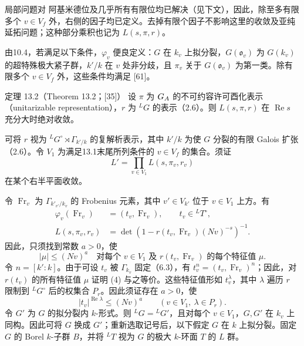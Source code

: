 局部问题对 阿基米德位及几乎所有有限位均已解决（见下文），因此，除至多有限多个 $v\in V_f$ 外，右侧的因子均已定义。去掉有限个因子不影响这里的收敛及亚纯延拓问题；这种部分乘积也记为 $L(s,\pi,r)$。

由10.4，若满足以下条件，$\varphi_v$ 便良定义：$G$ 在 $k_v$ 上拟分裂，$G(\mathfrak o_v)$ 为 $G(k_v)$ 的超特殊极大紧子群，$k'/k$ 在 $v$ 处非分歧，且 $\pi_v$ 关于 $G(\mathfrak o_v)$ 为第一类。除有限多个 $v\in V_f$ 外，这些条件均满足 [61]。

\begin{originaltheorem}{定理 13.2（Theorem 13.2；[35]）}
设 $\pi$ 为 $G_{A}$ 的不可约容许可酉化表示（unitarizable representation），$r$ 为 ${}^LG$ 的表示（2.6）。则 $L(s,\pi,r)$ 在 $\operatorname{Re}s$ 充分大时绝对收敛。
\end{originaltheorem}
可将 $r$ 视为 ${}^LG^\circ\rtimes\Gamma_{k'/k}$ 的复解析表示，其中 $k'/k$ 为使 $G$ 分裂的有限 Galois 扩张（2.6）。令 $V_1$ 为满足13.1末尾所列条件的 $v\in V_f$ 的集合。须证
\begin{equation}
 L'=\prod_{v\in V_1}L(s,\pi_v,r_v)\tag{1}
\end{equation}
在某个右半平面收敛。

令 $\operatorname{Fr}_v$ 为 $\Gamma_{k'_{v'}/k_v}$ 的 Frobenius 元素，其中 $v'\in V_{k'}$ 位于 $v\in V_1$ 上方。有
\begin{align}
 \varphi_v(\operatorname{Fr}_v)&=(t_v,\operatorname{Fr}_v),\qquad t_v\in{}^LT^\circ,\tag{2}\\
 L(s,\pi_v,r_v)&=\det(1-r(t_v,\operatorname{Fr}_v)(Nv)^{-s})^{-1}.\tag{3}
\end{align}
因此，只须找到常数 $a>0$，使
\begin{equation}
 |\mu|\leq(Nv)^a\quad
 \text{对每个 }v\in V_1\text{ 及 }r(t_v,\operatorname{Fr}_v)\text{ 的每个特征值 }\mu.\tag{4}
\end{equation}
令 $n=[k':k]$。由于可设 $t_v$ 被 $\Gamma_{k_v}$ 固定（6.3），有 $t_v^n=(t_v,\operatorname{Fr}_v)^n$；因此，对 $r(t_v)$ 的所有特征值 $\mu$ 证明 (4) 与之等价。这些特征值形如 $t_v^\lambda$，其中 $\lambda$ 遍历 $r$ 限制到 ${}^LG^\circ$ 后的权集合 $P_r$。因此须证存在 $a>0$，使
\begin{equation}
 |t_v|^{\operatorname{Re}\lambda}\leq(Nv)^a
 \qquad(v\in V_1,\ \lambda\in P_r).\tag{5}
\end{equation}
令 $G'$ 为 $G$ 的拟分裂内 $k$-形式。则 ${}^LG={}^LG'$，且对每个 $v\in V_1$，$G,G'$ 在 $k_v$ 上同构。因此可将 $G$ 换成 $G'$；重新选取记号后，以下假定 $G$ 在 $k$ 上拟分裂。固定 $G$ 的 Borel $k$-子群 $B$，并将 ${}^LT$ 视为 $G$ 的极大 $k$-环面 $T$ 的 $L$ 群。

